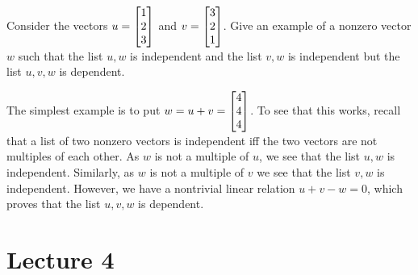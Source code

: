 \documentclass[a4paper]{amsart}
\renewenvironment{solution}{\SolutionInline}{\endSolutionInline}
\begin{document}
\begin{exercise}\label{ex-independent-ii}
 Consider the vectors $u=\left[\begin{matrix} 1\\2\\3\end{matrix}\right]$ and $v=\left[\begin{matrix} 3\\2\\1\end{matrix}\right]$.
 Give an example of a nonzero vector $w$ such that the list $u,w$ is
 independent and the list $v,w$ is independent but the list $u,v,w$ is
 dependent. 
\end{exercise}
\begin{solution}
 The simplest example is to put $w=u+v=\left[\begin{matrix} 4\\4\\4\end{matrix}\right]$.  To see that
 this works, recall that a list of two nonzero vectors is independent
 iff the two vectors are not multiples of each other.  As $w$ is not a
 multiple of $u$, we see that the list $u,w$ is independent.
 Similarly, as $w$ is not a multiple of $v$ we see that the list $v,w$
 is independent.  However, we have a nontrivial linear relation
 $u+v-w=0$, which proves that the list $u,v,w$ is dependent.
\end{solution}


\section{Lecture 4}
\end{document}
